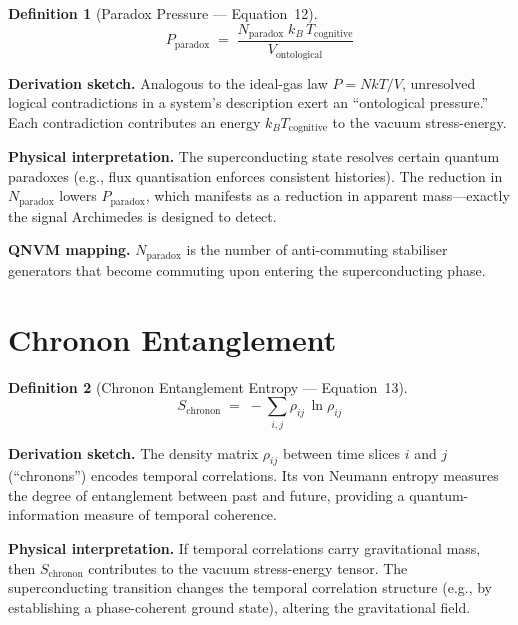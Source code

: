 \documentclass[11pt,a4paper]{article}
\newtheorem{definition}{Definition}[section]
\theoremstyle{remark}
\begin{document}
\begin{definition}[Paradox Pressure --- Equation~12]
\begin{equation}\label{eq:paradox}
    P_{\text{paradox}} \;=\; \frac{N_{\text{paradox}}\; k_B\, T_{\text{cognitive}}}{V_{\text{ontological}}}
\end{equation}
\end{definition}

\textbf{Derivation sketch.}\quad
Analogous to the ideal-gas law $P = NkT/V$, unresolved logical contradictions in a system's description exert an ``ontological pressure.''  Each contradiction contributes an energy $k_B T_{\text{cognitive}}$ to the vacuum stress-energy.

\textbf{Physical interpretation.}\quad
The superconducting state resolves certain quantum paradoxes (e.g., flux quantisation enforces consistent histories).  The reduction in $N_{\text{paradox}}$ lowers $P_{\text{paradox}}$, which manifests as a reduction in apparent mass---exactly the signal Archimedes is designed to detect.

\textbf{QNVM mapping.}\quad
$N_{\text{paradox}}$ is the number of anti-commuting stabiliser generators that become commuting upon entering the superconducting phase.

\section{Chronon Entanglement}
\label{sec:eq13}

\begin{definition}[Chronon Entanglement Entropy --- Equation~13]
\begin{equation}\label{eq:chronon}
    S_{\text{chronon}} \;=\; -\sum_{i,j} \rho_{ij}\, \ln \rho_{ij}
\end{equation}
\end{definition}

\textbf{Derivation sketch.}\quad
The density matrix $\rho_{ij}$ between time slices $i$ and $j$ (``chronons'') encodes temporal correlations.  Its von Neumann entropy measures the degree of entanglement between past and future, providing a quantum-information measure of temporal coherence.

\textbf{Physical interpretation.}\quad
If temporal correlations carry gravitational mass, then $S_{\text{chronon}}$ contributes to the vacuum stress-energy tensor.  The superconducting transition changes the temporal correlation structure (e.g., by establishing a phase-coherent ground state), altering the gravitational field.
\end{document}
